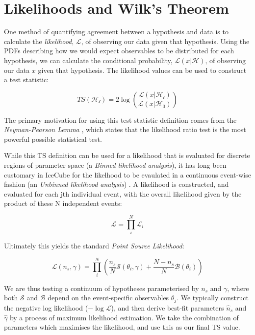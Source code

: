 \section{Likelihoods and Wilk's Theorem}

One method of quantifying agreement between a hypothesis and data is to calculate the \emph{likelihood}, $\mathcal{L}$, of observing our data given that hypothesis. Using the PDFs describing how we would expect observables to be distributed for each hypothesis, we can calculate the conditional probability, $\mathcal{L}(x | \mathcal{H})$, of observing our data $x$ given that hypothesis. The likelihood values can be used to construct a test statistic:

\begin{equation}
TS (\mathcal{H_{i}}) = 2 \log \left( \frac{\mathcal{L}(x | \mathcal{H_{i}})}{\mathcal{L}(x | \mathcal{H_{0}})} \right)
\label{eq:ts}
\end{equation}

The primary motivation for using this test statistic definition comes from the \emph{Neyman-Pearson Lemma} , which states that the likelihood ratio test is the most powerful possible statistical test. 

While this TS definition can be used for a likelihood that is evaluated for discrete regions of parameter space (a \emph{Binned likelihood analysis}), it has long been customary in IceCube for the likelhood to be evaulated in a continuous event-wise fashion (an \emph{Unbinned likelihood analysis}) . A likelihood is constructed, and evaluated for each jth individual event, with the overall likelihood given by the product of these N independent events:

\begin{equation}
	\mathcal{L} = \prod_{i}^{N} \mathcal{L}_{i}
\end{equation}

Ultimately this yields the standard \emph{Point Source Likelihood}:

\begin{equation}
	\mathcal{L}(n_{s}, \gamma) = \prod_{i}^{N} \left(\frac{n_{s}}{N} \mathcal{S}(\theta_{i}, \gamma) + \frac{N - n_{s}}{N} \mathcal{B}(\theta_{i})  \right)
\label{eq:ps_llh}
\end{equation}

We are thus testing a continuum of hypotheses parameterised by $n_{s}$ and $\gamma$, where both $\mathcal{S}$ and $\mathcal{B}$ depend on the event-specific observables $\theta_{j}$. We typically construct the negative log likelihood ($- \log\mathcal{L}$), and then derive best-fit parameters $\hat{n}_{s}$ and  $\hat{\gamma}$ by a process of maximum likelihood estimation. We take the combination of parameters which maximises the likelihood, and use this as our final TS value. 

